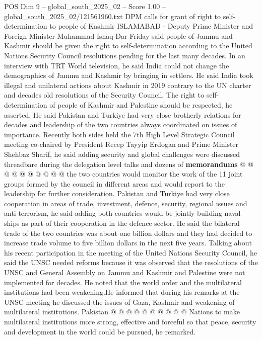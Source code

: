 \begin{textsample}{POS Dim 9 – global\_south\_2025\_02 – Score 1.00 – global\_south\_2025\_02/121561960.txt}  \label{ex:f9_pos_264}
DPM calls for grant of right to self-determination to people of Kashmir ISLAMABAD - Deputy Prime Minister and Foreign Minister Muhammad Ishaq Dar Friday said people of Jammu and Kashmir should be given the right to self-determination according to the United Nations Security Council resolutions pending for the last many decades.
In an interview with TRT World television, he said India could not change the demographics of Jammu and Kashmir by bringing in settlers.
He said India took illegal and unilateral actions about Kashmir in 2019 contrary to the UN charter and decades old resolutions of the Security Council.
The right to self-determination of people of Kashmir and Palestine should be respected, he asserted.
He said Pakistan and Turkiye had very close brotherly relations for decades and leadership of the two countries always coordinated on issues of importance.
Recently both sides held the 7th High Level Strategic Council meeting co-chaired by President Recep Tayyip Erdogan and Prime Minister Shehbaz Sharif, he said adding security and global challenges were discussed threadbare during the delegation level talks and dozens of \textbf{memorandums} @ @ @ @ @ @ @ @ @ @ the two countries would monitor the work of the 11 joint groups formed by the council in different areas and would report to the leadership for further consideration.
Pakistan and Turkiye had very close cooperation in areas of trade, investment, defence, security, regional issues and anti-terrorism, he said adding both countries would be jointly building naval ships as part of their cooperation in the defence sector.
He said the bilateral trade of the two countries was about one billion dollars and they had decided to increase trade volume to five billion dollars in the next five years.
Talking about his recent participation in the meeting of the United Nations Security Council, he said the UNSC needed reforms because it was observed that the resolutions of the UNSC and General Assembly on Jammu and Kashmir and Palestine were not implemented for decades.
He noted that the world order and the multilateral institutions had been weakening.He informed that during his remarks at the UNSC meeting he discussed the issues of Gaza, Kashmir and weakening of multilateral institutions.
Pakistan @ @ @ @ @ @ @ @ @ @ Nations to make multilateral institutions more strong, effective and forceful so that peace, security and development in the world could be pursued, he remarked.

\end{textsample}
